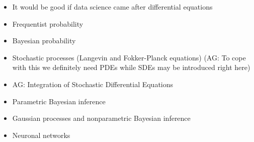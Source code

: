 \documentclass[12pt,twoside,fleqn,a4paper]{article}
\newcommand{\lp}[1]{{\color{red} #1}}  %
\newcommand{\ag}[1]{{\color{blue}AG: #1}}  %
\begin{document}
\begin{itemize}
\setlength\itemsep{0cm}
\item \lp{It would be good if data science came after differential equations}
\item Frequentist probability
\item Bayesian probability
\item Stochastic processes (Langevin and Fokker-Planck equations) (\ag{To cope with this we definitely need PDEs while SDEs may be introduced right here})
\item \ag{Integration of Stochastic Differential Equations}
\item Parametric Bayesian inference
\item Gaussian processes and nonparametric Bayesian inference
\item Neuronal networks
\end{itemize}


\end{document}
